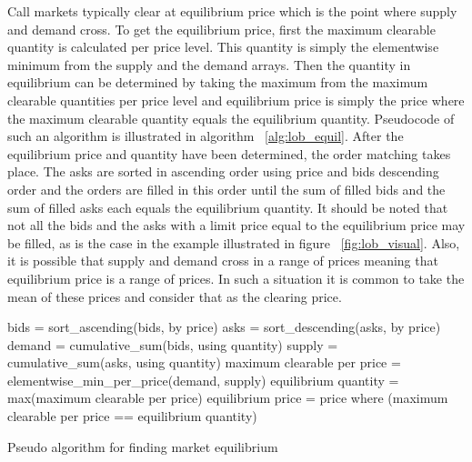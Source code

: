 Call markets typically clear at equilibrium price which is the point where
supply and demand cross. To get the equilibrium price, first the maximum clearable quantity
is calculated per price level. This quantity is simply the elementwise
minimum from the supply and the demand arrays. Then the quantity in equilibrium
can be determined by taking the maximum from the maximum clearable quantities
per price level and equilibrium price is simply the price where the maximum clearable quantity
equals the equilibrium quantity. Pseudocode of such an algorithm is illustrated in 
algorithm ~\ref{alg:lob_equil}. After the equilibrium price and quantity have been determined, the 
order matching takes place. The asks are sorted in ascending order using price and bids descending order
and the orders are filled in this order until the sum of filled bids and the sum of filled asks
each equals the equilibrium quantity. It should be noted that not all the bids and the asks with a limit price 
equal to the equilibrium price may be filled, as is the case in the example illustrated in figure ~\ref{fig:lob_visual}. 
Also, it is possible that supply and demand cross in a range of prices meaning that equilibrium price is 
a range of prices. In such a situation it is common to take the mean of these prices and consider that 
as the clearing price.


\begin{algorithm}[H]
    \SetAlgoLined
    \DontPrintSemicolon
    
    bids = sort\_ascending(bids, by price)\;
    asks = sort\_descending(asks, by price)\;
    \;
    demand = cumulative\_sum(bids, using quantity)\;
    supply = cumulative\_sum(asks, using quantity)\;
    \;
    maximum clearable per price = elementwise\_min\_per\_price(demand, supply)\;
    \;
    equilibrium quantity = max(maximum clearable per price)\;
    equilibrium price = price where (maximum clearable per price == equilibrium quantity)\;
    \caption{Pseudo algorithm for finding market equilibrium}
    \label{alg:lob_equil}
\end{algorithm}

